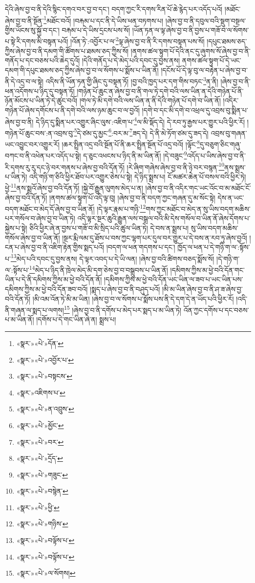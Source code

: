 དེའི་ཞེས་བྱ་བ་ནི་དེའི་སྙིང་དགའ་བར་བྱ་བ་དང་། བདག་ཀྱང་རི་དགས་རིན་པོ་ཆེ་རྙེད་པར་འདོད་པའོ། །མཐོང་ཞེས་བྱ་བ་ནི་སྔོན་\footnote{«སྣར་»«པེ་»དོན་}མཐོང་བའོ། །བརྐམ་པ་དང་ནི་དེ་ཡིས་ཕན་བཏགས་པ། །ཞེས་བྱ་བ་ནི་དབུལ་བའི་སྡུག་བསྔལ་གྱིས་ཡོངས་སུ་སྐྱོ་བ་དང་། བརྐམ་པ་དེ་ཡིས་དྲངས་པས་སོ། །ཡོན་ཏན་ལ་ལྟ་ཞེས་བྱ་བ་ནི་བྱས་པ་གཟོ་བ་ལ་སོགས་པ་སྟེ་རི་དགས་མི་བསྟན་པའོ། །འོན་ཏེ་:འབྱོར་པ་ལ་\footnote{«སྣར་»«པེ་»འབྱོར་པ་}ལྟ་ཞེས་བྱ་བ་ནི་རི་དགས་བསྟན་པས་སོ། །དཔུང་ཐམས་ཅད་ཀྱིས་ཞེས་བྱ་བ་ནི་དམག་གི་ཚོགས་པ་ཐམས་ཅད་ཀྱིས་སོ། །ནགས་ཚལ་སྟུག་པོ་དེའི་ནང་དུ་ཞུགས་སོ་ཞེས་བྱ་བ་ནི་གནོད་པ་དང་བཅས་པའི་ཆེད་དུའོ། །དེའི་གནོད་པ་དེ་མེད་པའི་དབང་དུ་བྱས་ནས། ནགས་ཚལ་སྟུག་པོ་དེ་ཡང་དམག་གི་དཔུང་ཐམས་ཅད་ཀྱིས་ཞེས་བྱ་བ་ལ་སོགས་པ་སྨོས་པ་ཡིན་ནོ། །དངོས་པོ་དེ་ལྟ་བུ་ལ་བརྟེན་པ་ཞེས་བྱ་བ་ནི་དེ་འདྲ་བ་ལ་སྟེ། འདིས་ནི་ཡོན་ཏན་གྱི་ཞིང་དུ་བསྟན་ཏོ། །བྱ་བའི་ཁྱད་པར་དག་གིས་བཏང་\footnote{«སྣར་»«པེ་»བསྟངས་}ན་ནི། །ཞེས་བྱ་བ་ནི་ཕན་འདོགས་པ་ཉིད་དུ་བསྟན་ཏོ། །གཉེན་པོ་ཆུང་ན་ཞེས་བྱ་བ་ནི་གལ་ཏེ་དགེ་བའི་ལས་ཡིན་ན་དེའི་གཉེན་པོ་ནི་ཉོན་མོངས་པ་ཡིན་ཏེ་དེ་ཚུང་བའོ། །གལ་ཏེ་མི་དགེ་བའི་ལས་ཡིན་ན་ནི་དེའི་གཉེན་པོ་དགེ་བ་ཡིན་ནོ། །འདིར་གཉེན་པོ་ཞེས་དགོངས་པ་ནི་དགེ་བའི་ལས་ཉམ་ཆུང་བ་ལ་བྱའོ། །དགེ་བ་དང་མི་དགེ་བ་འཕྲལ་དུ་འབྲས་བུ་སྨིན་པ་ཞེས་བྱ་བ་ནི། དེ་ཉིད་དུ་སྨིན་པར་འགྱུར་ཞིང་ལུས་:འཇིག་པ་\footnote{«སྣར་»འཇིགས་པ་}ལ་མི་སྡོད་དེ། དེ་རབ་ཏུ་རྒྱས་པར་གྱུར་པའི་ཕྱིར་རོ། །གཉེན་པོ་ཆུང་བས་:ན་འབྲས་བུ་\footnote{«སྣར་»«པེ་»ན་འབྲུས་}དེ་ཙམ་དུ་མྱང་\footnote{«སྣར་»«པེ་»མྱོང་}:བར་མ་\footnote{«སྣར་»«པེ་»བར་}ཟད་དེ། དེ་ནི་མེ་ཏོག་ཙམ་དུ་ཟད་དེ། འབྲས་བུ་གཞན་ཡང་འབྱུང་བར་འགྱུར་རོ། །ཆར་སྤྲིན་འདྲ་བའི་སྔོན་པོ་ནི་ཆར་སྤྲིན་སྔོན་པོ་འདྲ་བའོ། །ལྟོང་\footnote{«སྣར་»«པེ་»དྲོད་}དུ་བཅུག་ཅིང་གཞུ་བཀང་བ་ནི་འཕེན་པར་འདོད་པ་སྟེ། ད་ཅུང་འཕངས་པ་ཉིད་ནི་མ་ཡིན་ནོ། །དེ་བཟུང་\footnote{«སྣར་»«པེ་»གཟུང་}འདོད་པ་ཡིས་ཞེས་བྱ་བ་ནི་རི་དགས་རུ་རུ་དང་ཉེ་བར་གནས་པ་ཞེས་བྱ་བའི་དོན་ཏོ། །རེ་ཞིག་གཞེས་ཞེས་བྱ་བ་ནི་ཉེ་བར་བསྙན་\footnote{«སྣར་»«པེ་»བསྙེན་}ནས་སྨྲས་པ་ཡིན་ཏེ། འདི་གཉི་ག་ཅིའི་ཕྱིར་ཐོབ་པར་འགྱུར་ཅེས་པ་སྟེ། དེ་ཉིད་སྨྲས་པ། ངོ་མཚར་ཆེན་པོ་བསལ་བའི་ཕྱིར་ཏེ། ཕྱེ་\footnote{«སྣར་»«པེ་»ཕྱི་}ནས་སྨྲའོ་ཞེས་བྱ་བའི་དོན་ཏོ། །སྐྱེ་བོ་རྒྱུན་ལུགས་མེད་པ་ན། །ཞེས་བྱ་བ་ནི་འདིར་གང་ཡང་འོང་བ་མ་མཐོང་ངོ་ཞེས་བྱ་བའི་དོན་ཏོ། །ནགས་ཚལ་སྟུག་པོ་འདི་ལྟ་བུ། །ཞེས་བྱ་བ་ནི་བདག་ཀྱང་གཞན་དུ་མ་སོང་སྟེ། དེས་ན་ཡང་བདག་མཐོང་བ་མེད་དོ་ཞེས་བྱ་བ་ཡིན་ནོ། །དེ་ལྟར་རྣམ་པ་གཉི་\footnote{«སྣར་»«པེ་»གཉིས་}གས་ཀྱང་མཐོང་བ་མེད་ན་སུ་ཡིས་བདག་མཆིས་པར་གསོལ་བ་ཞེས་བྱ་བ་ཡིན་ཏེ། འདི་ལྟར་སྔར་ཆུའི་རྒྱུན་ལས་བསྒྲལ་བའི་མི་དེས་གསོལ་བ་ཡིན་ནོ་ཞེས་དོགས་པ་སྐྱེས་པ་སྟེ། ཅིའི་ཕྱིར་ཞེ་ན་བྱས་པ་གཟོ་བ་མི་སྲིད་པའི་ཚུལ་ཡིན་ཏེ། དེ་བས་ན་སྨྲས་པ། སུ་ཡིས་བདག་མཆིས་གསོལ་ཞེས་བྱ་བ་ཡིན་ནོ། །སྔར་རྨི་ལམ་དུ་ཐོས་པ་བས་ཀྱང་ལྷག་པར་དུལ་བར་གྱུར་པ་དེ་བས་ན་རབ་ཏུ་ཞེས་བྱའོ། །ངན་པ་ཞེས་བྱ་བ་ནི་འཇིག་རྟེན་གྱིས་སྨད་པའོ། །བདག་ལ་ཕན་གདགས་པ་དང་། ཁྱོད་ལ་ཕན་པ་དེ་གཉི་ག་ལ་:སྟོས་པ་\footnote{«སྣར་»«པེ་»བལྟོས་པ་}མེད་པའི་དབང་དུ་བྱས་ནས། དེ་ལྟར་འབད་པ་དེ་ཡི་ལན། །ཞེས་བྱ་བའི་ཚིགས་བཅད་སྨོས་སོ། །དེ་གཉི་ག་ལ་:སྟོས་པ་\footnote{«སྣར་»«པེ་»བལྟོས་པ་}མེད་པ་ཉིད་ནི་ཁྲེལ་མེད་མི་དག་ཅེས་བྱ་བ་བསྒྲུབས་པ་ཡིན་ནོ། །དམིགས་ཀྱིས་མ་ཕྱེ་བའི་དོན་གང་ཡིན་པ་དེ་ནི་དམིགས་ཀྱིས་མ་ཕྱེ་བའི་དོན་ནོ། །དམིགས་ཀྱིས་མ་ཕྱེ་བའི་དོན་ཡང་ཡིན་ལ་ཟབ་པ་ཡང་ཡིན་པས་དམིགས་ཀྱིས་མ་ཕྱེ་བའི་དོན་ཟབ་བའོ། །སྨད་པ་ཞེས་བྱ་བ་ནི་བཤུད་པའོ། །མི་མ་ཡིན་ཞེས་བྱ་བ་ནི་ཤ་ཟ་ཞེས་བྱ་བའི་དོན་ཏོ། །མི་འམ་འོན་ཏེ་མི་མ་ཡིན། །ཞེས་བྱ་བ་ལ་སོགས་པ་སྨོས་པས་ནི་དེ་དག་དེ་ན་ཡོད་པའི་ཕྱིར་རོ། །འདི་ནི་གཞན་ལ་སྨད་པ་ལགས།\footnote{«སྣར་»«པེ་»ལ་སོགས།} །ཞེས་བྱ་བ་ནི་དགོས་པ་མེད་པར་སྨད་པ་མ་ཡིན་ཏེ། འོན་ཀྱང་དགོས་པ་དང་བཅས་པ་མ་ཡིན་ནོ། །དགོས་པ་དེ་གང་ཡིན་ཞེ་ན། སྨྲས་པ། 